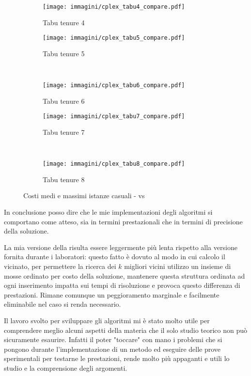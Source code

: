 \begin{figure}[htb]
	\centering
	\begin{subfigure}[b]{.45\textwidth}
			\texttt{[image: immagini/cplex\_tabu4\_compare.pdf]}
			\caption{Tabu tenure 4}
	\end{subfigure}
	\quad
	\begin{subfigure}[b]{.45\textwidth}
			\texttt{[image: immagini/cplex\_tabu5\_compare.pdf]}
			\caption{Tabu tenure 5}
	\end{subfigure}
	\\
	\begin{subfigure}[b]{.45\textwidth}
			\texttt{[image: immagini/cplex\_tabu6\_compare.pdf]}
			\caption{Tabu tenure 6}
	\end{subfigure}
	\quad
	\begin{subfigure}[b]{.45\textwidth}
			\texttt{[image: immagini/cplex\_tabu7\_compare.pdf]}
			\caption{Tabu tenure 7}
	\end{subfigure}
	\\
	\begin{subfigure}[b]{.45\textwidth}
			\texttt{[image: immagini/cplex\_tabu8\_compare.pdf]}
			\caption{Tabu tenure 8}
	\end{subfigure}
	\caption{Costi medi e massimi istanze casuali -  vs \tabu}
	\label{fig:costi cplex tabu}
\end{figure}

In conclusione posso dire che le mie implementazioni degli algoritmi si comportano come atteso, sia in termini prestazionali che in termini di precisione della soluzione.

La mia versione della \tabu risulta essere leggermente più lenta rispetto alla versione fornita durante i laboratori: questo fatto è dovuto al modo in cui calcolo il vicinato, per permettere la ricerca dei $k$ migliori vicini utilizzo un insieme di mosse ordinato per costo della soluzione, mantenere questa struttura ordinata ad ogni inserimento impatta sui tempi di risoluzione e provoca questo differenza di prestazioni.
Rimane comunque un peggioramento marginale e facilmente eliminabile nel caso si renda necessario.

Il lavoro svolto per sviluppare gli algoritmi mi è stato molto utile per comprendere meglio alcuni aspetti della materia che il solo studio teorico non può sicuramente esaurire. Infatti il poter "toccare" con mano i problemi che si pongono durante l'implementazione di un metodo ed eseguire delle prove sperimentali per testarne le prestazioni, rende molto più appaganti e utili lo studio e la comprensione degli argomenti.